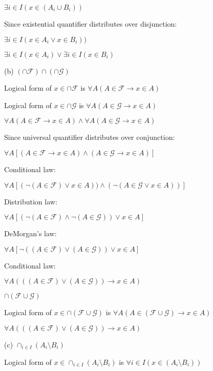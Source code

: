 \documentclass{article}
\begin{document}
$\exists i \in I (x \in (A_i \cup B_i))$

Since existential quantifier distributes over disjunction:

$\exists i \in I (x \in A_i \lor x \in B_i))$

$\exists i \in I (x \in A_i) \lor \exists i \in I (x \in B_i)$

\vspace{20pt}

(b) $(\cap \mathcal{F}) \cap (\cap \mathcal{G})$

Logical form of $x \in \cap \mathcal{F}$ is $\forall A(A \in \mathcal{F} \to x \in A)$

Logical form of $x \in \cap \mathcal{G}$ is $\forall A(A \in \mathcal{G} \to x \in A)$

$\forall A(A \in \mathcal{F} \to x \in A) \land \forall A(A \in \mathcal{G} \to x \in A)$

Since universal quantifier distributes over conjunction:

$\forall A[(A \in \mathcal{F} \to x \in A) \land (A \in \mathcal{G} \to x \in A)]$

Conditional law:

$\forall A[(\neg (A \in \mathcal{F}) \lor x \in A)) \land (\neg (A \in \mathcal{G} \lor x \in A))]$

Distribution law:

$\forall A[(\neg (A \in \mathcal{F}) \land \neg (A \in \mathcal{G})) \lor x \in A]$

DeMorgan's law:

$\forall A[\neg ((A \in \mathcal{F}) \lor (A \in \mathcal{G})) \lor x \in A]$

Conditional law:

$\forall A (((A \in \mathcal{F}) \lor (A \in \mathcal{G})) \to x \in A)$

\vspace{10pt}

$\cap (\mathcal{F} \cup \mathcal{G})$

Logical form of $x \in \cap (\mathcal{F} \cup \mathcal{G})$ is $\forall A (A \in (\mathcal{F} \cup \mathcal{G}) \to x \in A)$

$\forall A (((A \in \mathcal{F}) \lor (A \in \mathcal{G})) \to x \in A)$

\vspace{20pt}

(c) $\cap_{i \in I} (A_i \setminus B_i)$

Logical form of $x \in \cap_{i \in I} (A_i \setminus B_i)$ is $\forall i \in I (x \in (A_i \setminus B_i))$
\end{document}
